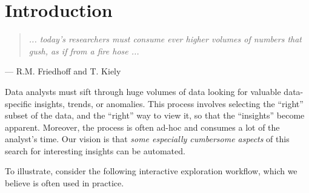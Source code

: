 \documentclass{sig-alternate}
\begin{document}
\maketitle                                          

\vspace{-10pt}                                                     
                                             

\begin{abstract}
Data scientists rely on visualizations to interpret the data returned by queries, but finding the right visualization remains a manual task that is often laborious. We propose a DBMS that partially automates the task of finding the right visualizations for a query. In a nutshell, given an input query Q, the new DBMS optimizer will explore not only the space of physical plans for Q, but also the space of possible visualizations for the results of Q. The output will comprise a recommendation of potentially ``interesting'' or ``useful'' visualizations, where each visualization is coupled with a suitable query execution plan. We discuss the technical challenges in building this system and outline an agenda for future research.
\end{abstract}


\section{Introduction}\label{sec:intro}
\vspace{-10pt}
\begin{quote} {\em
... today's researchers must consume ever higher volumes 
of numbers that gush, as if from a fire hose ... 
}
\end{quote}
\vspace{-7 pt}
\noindent \hspace{80pt} --- R.M. Friedhoff and T. Kiely
\smallskip

Data analysts must sift through huge volumes of data
looking for valuable data-specific insights, trends, or anomalies.
This process involves selecting the ``right'' subset of the data,
and the ``right'' way to view it, so that the ``insights'' become apparent.
Moreover, the process is often ad-hoc and consumes a lot of the analyst's time.
Our vision is that {\em some especially cumbersome aspects} of this search 
for interesting insights can be automated.

To illustrate, consider the following interactive exploration workflow,
which we believe is often used in practice.
\end{document}
